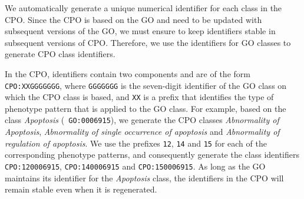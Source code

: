 \documentclass{bioinfo}
\begin{document}
We automatically generate a unique numerical identifier for each class
in the CPO.  Since the CPO is based on the GO and need to be updated
with subsequent versions of the GO, we must ensure to keep identifiers
stable in subsequent versions of CPO. Therefore, we use the
identifiers for GO classes to generate CPO class identifiers.

In the CPO, identifiers contain two components and are of the form
{\tt CPO:XXGGGGGGG}, where {\tt GGGGGGG} is the seven-digit identifier
of the GO class on which the CPO class is based, and {\tt XX} is a
prefix that identifies the type of phenotype pattern that is applied
to the GO class. For example, based on the class {\em Apoptosis} ({\tt
  GO:0006915}), we generate the CPO classes {\em Abnormality of
  Apoptosis}, {\em Abnormality of single occurrence of apoptosis} and
{\em Abnormality of regulation of apoptosis}.  We use the prefixes
{\tt 12}, {\tt 14} and {\tt 15} for each of the corresponding
phenotype patterns, and consequently generate the class identifiers
{\tt CPO:120006915}, {\tt CPO:140006915} and {\tt CPO:150006915}. As
long as the GO maintains its identifier for the {\em Apoptosis} class,
the identifiers in the CPO will remain stable even when it is
regenerated.
\end{document}
